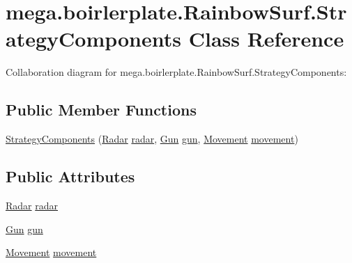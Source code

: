 \hypertarget{classmega_1_1boirlerplate_1_1_rainbow_surf_1_1_strategy_components}{}\section{mega.\+boirlerplate.\+Rainbow\+Surf.\+Strategy\+Components Class Reference}
\label{classmega_1_1boirlerplate_1_1_rainbow_surf_1_1_strategy_components}


Collaboration diagram for mega.\+boirlerplate.\+Rainbow\+Surf.\+Strategy\+Components\+:
\subsection*{Public Member Functions}
\begin{DoxyCompactItemize}
\item 
\hyperlink{classmega_1_1boirlerplate_1_1_rainbow_surf_1_1_strategy_components_af53c0a8fa7b4dea42386187d31787bcd}{Strategy\+Components} (\hyperlink{classmega_1_1boirlerplate_1_1_radar}{Radar} \hyperlink{classmega_1_1boirlerplate_1_1_rainbow_surf_1_1_strategy_components_a5a223484a2bc69f71d62377ed43d8033}{radar}, \hyperlink{classmega_1_1boirlerplate_1_1_gun}{Gun} \hyperlink{classmega_1_1boirlerplate_1_1_rainbow_surf_1_1_strategy_components_a4e9af62404c7f86d5fc1ef087faaef9c}{gun}, \hyperlink{classmega_1_1boirlerplate_1_1_movement}{Movement} \hyperlink{classmega_1_1boirlerplate_1_1_rainbow_surf_1_1_strategy_components_a5129576fecff213f2f0dcfe8a79389c0}{movement})
\end{DoxyCompactItemize}
\subsection*{Public Attributes}
\begin{DoxyCompactItemize}
\item 
\hyperlink{classmega_1_1boirlerplate_1_1_radar}{Radar} \hyperlink{classmega_1_1boirlerplate_1_1_rainbow_surf_1_1_strategy_components_a5a223484a2bc69f71d62377ed43d8033}{radar}
\item 
\hyperlink{classmega_1_1boirlerplate_1_1_gun}{Gun} \hyperlink{classmega_1_1boirlerplate_1_1_rainbow_surf_1_1_strategy_components_a4e9af62404c7f86d5fc1ef087faaef9c}{gun}
\item 
\hyperlink{classmega_1_1boirlerplate_1_1_movement}{Movement} \hyperlink{classmega_1_1boirlerplate_1_1_rainbow_surf_1_1_strategy_components_a5129576fecff213f2f0dcfe8a79389c0}{movement}
\end{DoxyCompactItemize}


